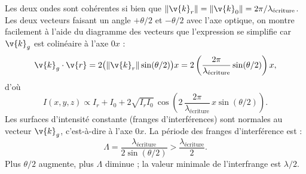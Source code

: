 Les deux ondes sont cohérentes si bien que
$\|\v{k}_r\|=\|\v{k}_0\|=2\pi/\lambda_{\text{écriture}}$. Les deux vecteurs
faisant un angle $+\theta/2$ et $-\theta/2$ avec l'axe optique, on montre
facilement à l'aide du diagramme des vecteurs que l'expression se simplifie car
$\v{k}_g$ est colinéaire à l'axe $0x$ :
\begin{equation*}
  \v{k}_g\cdot\v{r} = 2\big(\|\v{k}_r\|\sin(\theta/2)\big)x
  = 2\left(\frac{2\pi}{\lambda_{\text{écriture}}}\sin(\theta/2)\right)x,
\end{equation*}
d'où
\begin{equation*}
  I(x,y,z) \propto I_r+I_0+2\sqrt{I_r I_0}\,
  \cos\!\left(2\,\frac{2\pi}{\lambda_{\text{écriture}}}\,x\sin(\theta/2)\right).
\end{equation*}
Les surfaces d'intensité constante (franges d'interférences) sont normales au
vecteur $\v{k}_g$, c'est-à-dire à l'axe $0x$. La période des franges
d'interférence est :
\begin{equation*}
  \boxed{\;\Lambda = \frac{\lambda_{\text{écriture}}}{2\sin(\theta/2)}
  > \frac{\lambda_{\text{écriture}}}{2}.\;}
\end{equation*}
Plus $\theta/2$ augmente, plus $\Lambda$ diminue ; la valeur minimale de
l'interfrange est $\lambda/2$.

